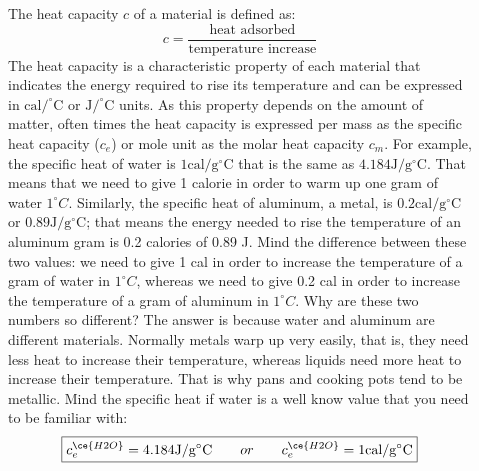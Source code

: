\documentclass[main.tex]{subfiles}
\begin{document}
\begin{description}
\item[] 
The heat capacity $c$ of a material is defined as:
\begin{equation}
 c=\frac{\text{heat adsorbed}}{\text{temperature increase}}   
\end{equation}
The heat capacity is a characteristic property of each material that indicates the energy required to rise its temperature and can be expressed in $\text{cal}/^{\circ}\text{C}$ or $\text{J}/^{\circ}\text{C}$ units. As this property depends on the amount of matter, often times the heat capacity is expressed per mass as the specific heat capacity ($c_e$) or mole unit as the molar heat capacity $c_m$. For example, the specific heat of water is $1 \text{cal}/\text{g}^{\circ}\text{C}$ that is the same as $4.184 \text{J}/\text{g}^{\circ}\text{C}$. That means that we need to give 1 calorie in order to warm up one gram of water $1^{\circ}C$. Similarly, the specific heat of aluminum, a metal, is $0.2 \text{cal}/\text{g}^{\circ}\text{C}$ or $0.89\text{J}/\text{g}^{\circ}\text{C}$; that means the energy needed to rise the temperature of an aluminum gram is  0.2 calories of 0.89 J. Mind the difference between these two values: we need to give 1 cal in order to increase the temperature of a gram of water in $1^{\circ}C$, whereas we need to give 0.2 cal in order to increase the temperature of a gram of aluminum in $1^{\circ}C$. Why are these two numbers so different? The answer is because water and aluminum are different materials. Normally metals warp up very easily, that is, they need less heat to increase their temperature, whereas liquids need more heat to increase their temperature. That is why pans and cooking pots tend to be metallic. Mind the specific heat if water is a well know value that you need to be familiar with:
\begin{equation}
\boxed{   c_e^{\ce{H2O}} = 4.184 \text{J}/\text{g}^{\circ}\text{C} \qquad or \qquad  c_e^{\ce{H2O}} = 1 \text{cal}/\text{g}^{\circ}\text{C} }
\label{formula2:9}
\end{equation}



\end{description}
\end{document}
